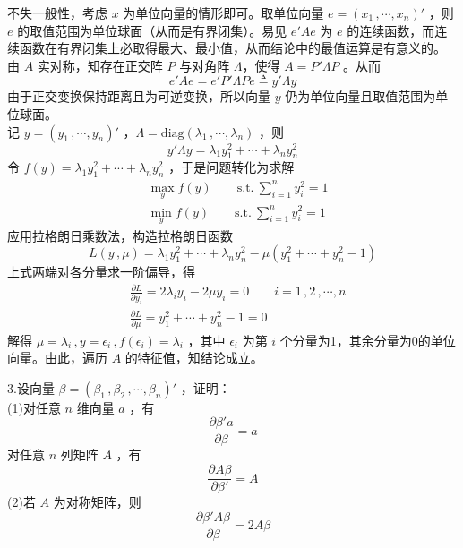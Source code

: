 \documentclass[12pt,hyperref,]{ctexart}
\begin{document}
不失一般性，考虑 \(x\) 为单位向量的情形即可。取单位向量
\(e=(x_1\, ,\cdots ,x_n)'\) ，则 \(e\)
的取值范围为单位球面（从而是有界闭集）。易见 \(e'Ae\) 为 \(e\)
的连续函数，而连续函数在有界闭集上必取得最大、最小值，从而结论中的最值运算是有意义的。\\
由 \(A\) 实对称，知存在正交阵 \(P\) 与对角阵 \(\Lambda\)，使得
\(A=P'\Lambda P\) 。从而 \begin{equation*}
e'Ae=e'P'\Lambda Pe \triangleq y'\Lambda y
\end{equation*}由于正交变换保持距离且为可逆变换，所以向量 \(y\)
仍为单位向量且取值范围为单位球面。\\
记 \(y=(y_1\, ,\cdots ,y_n)'\)
，\(\Lambda=\mathrm{diag}(\lambda_1\, ,\cdots ,\lambda_n)\) ，则
\begin{equation*}
y'\Lambda y=\lambda_1y_1^2+\cdots +\lambda_ny_n^2
\end{equation*}令 \(f(y)=\lambda_1y_1^2+\cdots +\lambda_ny_n^2\)
，于是问题转化为求解 \begin{equation*}
\begin{aligned}
& \max_{y}f(y) \qquad \mathrm{s.t.} \ \sum_{i=1}^{n}y_i^2=1 \\
& \min_{y}f(y) \qquad \mathrm{s.t.} \ \sum_{i=1}^{n}y_i^2=1
\end{aligned}
\end{equation*}应用拉格朗日乘数法，构造拉格朗日函数 \begin{equation*}
L(y\, ,\mu)= \lambda_1y_1^2+\cdots +\lambda_ny_n^2-\mu(y_1^2+\cdots +y_n^2-1)
\end{equation*}上式两端对各分量求一阶偏导，得 \begin{equation*}
\begin{aligned}
& \frac{\partial L}{\partial y_i}=2\lambda_iy_i-2\mu y_i=0 \qquad i=1\, ,2\, ,\cdots ,n \\
& \frac{\partial L}{\partial \mu}=y_1^2+\cdots +y_n^2-1=0
\end{aligned}
\end{equation*}解得
\(\mu=\lambda_i \, ,y=\epsilon_i\, ,f(\epsilon_i)=\lambda_i\) ，其中
\(\epsilon_i\) 为第 \(i\) 个分量为1，其余分量为0的单位向量。由此，遍历
\(A\) 的特征值，知结论成立。

\vspace{3em}

\kaishu

3.设向量 \(\beta=(\beta_1\, ,\beta_2\, ,\cdots ,\beta_n)'\) ，证明：\\
(1)对任意 \(n\) 维向量 \(a\) ，有 \begin{equation*}
\frac{\partial \beta' a}{\partial \beta}=a
\end{equation*}对任意 \(n\) 列矩阵 \(A\) ，有 \begin{equation*}
\frac{\partial A\beta}{\partial \beta'}=A
\end{equation*}(2)若 \(A\) 为对称矩阵，则 \begin{equation*}
\frac{\partial \beta' A\beta}{\partial \beta}=2A\beta
\end{equation*} \vspace{1em}
\end{document}
